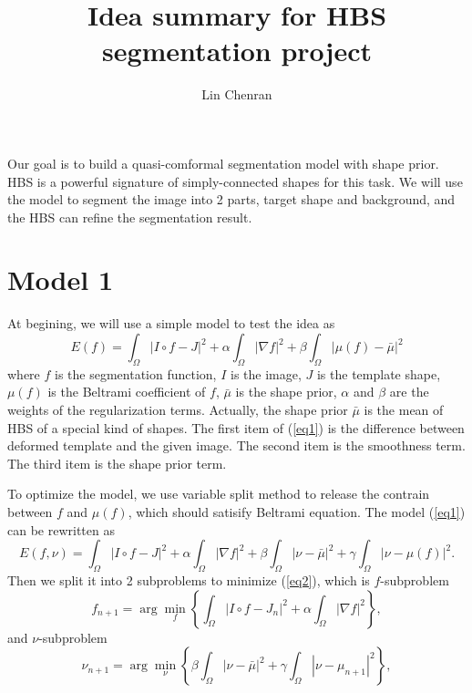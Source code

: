 \documentclass{article}
\begin{document}
\title{Idea summary for HBS segmentation project}
\author{Lin Chenran}
\maketitle

Our goal is to build a quasi-comformal segmentation model with shape prior. HBS is a powerful signature of simply-connected shapes for this task. We will use the model to segment the image into 2 parts, target shape and background, and the HBS can refine the segmentation result.


\section{Model 1}
At begining, we will use a simple model to test the idea as
\begin{equation}\label{eq1}
    E(f) = \int_\Omega | I \circ f - J  |^2 + \alpha \int_\Omega | \nabla f |^2 + \beta \int_\Omega | \mu(f) - \bar{\mu} |^2
\end{equation}
where $f$ is the segmentation function, $I$ is the image, $J$ is the template shape, $\mu(f)$ is the Beltrami coefficient of $f$, $\bar{\mu}$ is the shape prior, $\alpha$ and $\beta$ are the weights of the regularization terms. Actually, the shape prior $\bar{\mu}$ is the mean of HBS of a special kind of shapes. The first item of (\ref{eq1}) is the difference between deformed template and the given image. The second item is the smoothness term. The third item is the shape prior term.

To optimize the model, we use variable split method to release the contrain between $f$ and $\mu(f)$, which should satisify Beltrami equation. The model (\ref{eq1}) can be rewritten as
\begin{equation}\label{eq2}
    E(f, \nu) = \int_\Omega | I \circ f - J  |^2 + \alpha \int_\Omega | \nabla f |^2 + \beta \int_\Omega | \nu - \bar{\mu} |^2 + \gamma \int_\Omega | \nu - \mu(f) |^2.
\end{equation}
Then we split it into 2 subproblems to minimize (\ref{eq2}), which is $f$-subproblem
\begin{equation}\label{eq3}
    f_{n+1} = \arg\min_{f} \left\{ \int_\Omega | I \circ f - J_n  |^2 + \alpha \int_\Omega | \nabla f |^2 \right\},
\end{equation}
and $\nu$-subproblem
\begin{equation}\label{eq4}
    \nu_{n+1} = \arg\min_{\nu} \left\{\beta \int_\Omega | \nu - \bar{\mu} |^2 + \gamma \int_\Omega | \nu - \mu_{n+1} |^2 \right\},
\end{equation}
\end{document}
